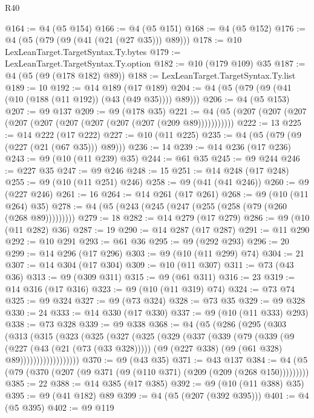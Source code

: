 \begin{lexlean}{R40}
\begin{coremodule}
{{{{{{{{{{{{{{{{{{{{{{{{{{{{{{{{{{{{{{{{{{{{{{{{{{{{{{{{{{{{{{{{{{{{{{{{{{{{{{{{{{{{{{{{{{{{{{{{{{{{{{{{{{{{{@164 := @4 (@5 @154)
@166 := @4 (@5 @151)
@168 := @4 (@5 @152)
@176 := @4 (@5 (@79 (@9 (@41 (@21 (@27 @35))) @89)))
@178 := @10 LexLeanTarget.TargetSyntax.Ty.bytes
@179 := LexLeanTarget.TargetSyntax.Ty.option
@182 := @10 (@179 @109) @35
@187 := @4 (@5 (@9 (@178 @182) @89))
@188 := LexLeanTarget.TargetSyntax.Ty.list
@189 := 10
@192 := @14 @189 (@17 @189)
@204 := @4 (@5 (@79 (@9 (@41 (@10 (@188 (@11 @192)) (@43 (@49 @35)))) @89)))
@206 := @4 (@5 @153)
@207 := @9 @137
@209 := @9 (@178 @35)
@221 := @4 (@5 (@207 (@207 (@207 (@207 (@207 (@207 (@207 (@207 (@207 (@209 @89)))))))))))
@222 := 13
@225 := @14 @222 (@17 @222)
@227 := @10 (@11 @225)
@235 := @4 (@5 (@79 (@9 (@227 (@21 (@67 @35))) @89)))
@236 := 14
@239 := @14 @236 (@17 @236)
@243 := @9 (@10 (@11 @239) @35)
@244 := @61 @35
@245 := @9 @244
@246 := @227 @35
@247 := @9 @246
@248 := 15
@251 := @14 @248 (@17 @248)
@255 := @9 (@10 (@11 @251) @246)
@258 := @9 (@41 (@41 @246))
@260 := @9 (@227 @246)
@261 := 16
@264 := @14 @261 (@17 @261)
@268 := @9 (@10 (@11 @264) @35)
@278 := @4 (@5 (@243 (@245 (@247 (@255 (@258 (@79 (@260 (@268 @89)))))))))
@279 := 18
@282 := @14 @279 (@17 @279)
@286 := @9 (@10 (@11 @282) @36)
@287 := 19
@290 := @14 @287 (@17 @287)
@291 := @11 @290
@292 := @10 @291
@293 := @61 @36
@295 := @9 (@292 @293)
@296 := 20
@299 := @14 @296 (@17 @296)
@303 := @9 (@10 (@11 @299) @74)
@304 := 21
@307 := @14 @304 (@17 @304)
@309 := @10 (@11 @307)
@311 := @73 (@43 @36)
@313 := @9 (@309 @311)
@315 := @9 (@61 @311)
@316 := 23
@319 := @14 @316 (@17 @316)
@323 := @9 (@10 (@11 @319) @74)
@324 := @73 @74
@325 := @9 @324
@327 := @9 (@73 @324)
@328 := @73 @35
@329 := @9 @328
@330 := 24
@333 := @14 @330 (@17 @330)
@337 := @9 (@10 (@11 @333) @293)
@338 := @73 @328
@339 := @9 @338
@368 := @4
    (@5
      (@286
        (@295
          (@303
            (@313
              (@315
                (@323
                  (@325
                    (@327
                      (@325
                        (@329
                          (@337
                            (@339
                              (@79
                                (@339
                                  (@9
                                    (@227 (@43 (@21 (@73 (@33 @328)))))
                                    (@9 (@227 @338) (@9 (@61 @328) @89))))))))))))))))))
@370 := @9 (@43 @35)
@371 := @43 @137
@384 := @4 (@5 (@79 (@370 (@207 (@9 @371 (@9 (@110 @371) (@209 (@209 (@268 @150)))))))))
@385 := 22
@388 := @14 @385 (@17 @385)
@392 := @9 (@10 (@11 @388) @35)
@395 := @9 (@41 @182) @89
@399 := @4 (@5 (@207 (@392 @395)))
@401 := @4 (@5 @395)
@402 := @9 @119
}}}}}}}}}}}}}}}}}}}}}}}}}}}}}}}}}}}}}}}}}}}}}}}}}}}}}}}}}}}}}}}}}}}}}}}}}}}}}}}}}}}}}}}}}}}}}}}}}}}}}}}}}}}}}
\end{coremodule}
\end{lexlean}
